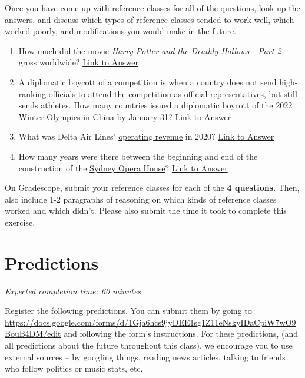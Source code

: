\documentclass[11pt]{article}
\begin{document}
Once you have come up with reference classes for all of the questions, look up the answers, and discuss which types of reference classes tended to work well, which worked poorly, and modifications you would make in the future. 

\begin{enumerate}
	\item How much did the movie \emph{Harry Potter and the Deathly Hallows - Part 2} gross worldwide? \href{https://en.wikipedia.org/wiki/Harry_Potter_and_the_Deathly_Hallows_%E2%80%93_Part_2#Box_office}{Link to Answer}
	\item A diplomatic boycott of a competition is when a country does not send high-ranking officials to attend the competition as official representatives, but still sends athletes. How many countries issued a diplomatic boycott of the 2022 Winter Olympics in China by January 31? \href{https://en.wikipedia.org/wiki/2022_Winter_Olympics#Diplomatic_boycotts}{Link to Answer}
	\item What was Delta Air Lines' \href{https://www.investopedia.com/terms/o/operating-revenue.asp}{operating revenue} in 2020? \href{https://ir.delta.com/news/news-details/2021/Delta-Air-Lines-Announces-December-Quarter-and-Full-Year-2020-Financial-Results/default.aspx}{Link to Answer}
	\item How many years were there between the beginning and end of the construction of the \href{https://en.wikipedia.org/wiki/Sydney_Opera_House#/media/File:Sydney_Australia._(21339175489).jpg}{Sydney Opera House}? \href{https://en.wikipedia.org/wiki/Sydney_Opera_House}{Link to Answer}
	
\end{enumerate}

On Gradescope, submit your reference classes for each of the \textbf{4 questions}. Then, also include 1-2 paragraphs of reasoning on which kinds of reference classes worked and which didn't. Please also submit the time it took to complete this exercise.

\section*{Predictions}

\emph{Expected completion time: 60 minutes}

Register the following predictions. You can submit them by going to \url{https://docs.google.com/forms/d/1Gja6hcs9jyDEE1sg1Z11eNskyIDaCpiW7wO9BouB4DM/edit} and following the form's instructions. For these predictions, (and all predictions about the future throughout this class), we encourage you to use external sources -- by googling things, reading news articles, talking to friends who follow politics or music stats, etc.
\end{document}
